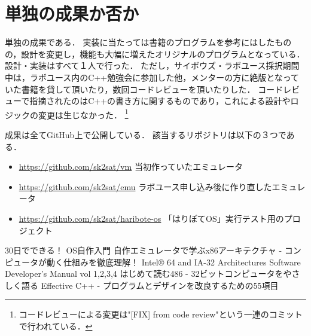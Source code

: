 \documentclass[10pt,a4j]{jsarticle}
\begin{document}
\section{単独の成果か否か}
\vspace{-2mm}
単独の成果である．
実装に当たっては書籍\cite{learn-x86-by-emu}のプログラムを参考にはしたものの，設計を変更し，機能も大幅に増えたオリジナルのプログラムとなっている．
設計・実装はすべて１人で行った．
ただし，サイボウズ・ラボユース採択期間中は，ラボユース内のC++勉強会に参加した他，メンターの方に絶版となっていた書籍\cite{read-486}を貸して頂いたり，数回コードレビューを頂いたりした．
コードレビューで指摘されたのはC++の書き方に関するものであり，これによる設計やロジックの変更は生じなかった．
\footnote{コードレビューによる変更は"[FIX] from code review"という一連のコミットで行われている．}

成果は全てGitHub上で公開している．
該当するリポジトリは以下の３つである．
\begin{itemize}
	\item \url{https://github.com/sk2sat/vm}			当初作っていたエミュレータ
	\item \url{https://github.com/sk2sat/emu}			ラボユース申し込み後に作り直したエミュレータ
	\item \url{https://github.com/sk2sat/haribote-os}	「はりぼてOS」実行テスト用のプロジェクト
\end{itemize}
\vspace{-5mm}
\begin{thebibliography}{99}
	 30日でできる！ OS自作入門
	 自作エミュレータで学ぶx86アーキテクチャ - コンピュータが動く仕組みを徹底理解！
	 Intel® 64 and IA-32 Architectures Software Developer’s Manual vol 1,2,3,4
	 はじめて読む486 - 32ビットコンピュータをやさしく語る
	 Effective C++ - プログラムとデザインを改良するための55項目
\end{thebibliography}
\end{document}
